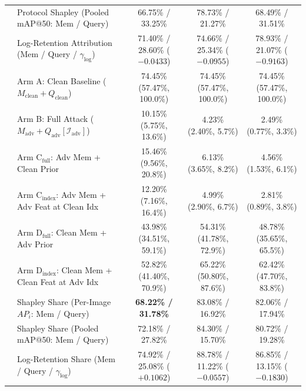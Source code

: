 \documentclass[preprint,10pt]{elsarticle}
\begin{document}
\begin{table}[!htbp]
{\begin{tabular}{llccc}
& Protocol Shapley (Pooled mAP@50: Mem / Query) & 66.75\% / 33.25\% & 78.73\% / 21.27\% & 68.49\% / 31.51\% \\
& Log-Retention Attribution (Mem / Query / $\gamma_{\mathrm{log}}$) & 71.40\% / 28.60\% ($-0.0433$) & 74.66\% / 25.34\% ($-0.0955$) & 78.93\% / 21.07\% ($-0.9163$) \\
\midrule
{} & Arm A: Clean Baseline ($M_{\mathrm{clean}} + Q_{\mathrm{clean}}$) & 74.45\% (57.47\%, 100.0\%) & 74.45\% (57.47\%, 100.0\%) & 74.45\% (57.47\%, 100.0\%) \\
& Arm B: Full Attack ($M_{\mathrm{adv}} + Q_{\mathrm{adv}}[\mathcal{I}_{\mathrm{adv}}]$) & 10.15\% (5.75\%, 13.6\%) & 4.23\% (2.40\%, 5.7\%) & 2.49\% (0.77\%, 3.3\%) \\
& Arm $\text{C}_{\text{full}}$: Adv Mem + Clean Prior & 15.46\% (9.56\%, 20.8\%) & 6.13\% (3.65\%, 8.2\%) & 4.56\% (1.53\%, 6.1\%) \\
& Arm $\text{C}_{\text{index}}$: Adv Mem + Adv Feat at Clean Idx & 12.20\% (7.16\%, 16.4\%) & 4.99\% (2.90\%, 6.7\%) & 2.81\% (0.89\%, 3.8\%) \\
& Arm $\text{D}_{\text{full}}$: Clean Mem + Adv Prior & 43.98\% (34.51\%, 59.1\%) & 54.31\% (41.78\%, 72.9\%) & 48.78\% (35.65\%, 65.5\%) \\
& Arm $\text{D}_{\text{index}}$: Clean Mem + Clean Feat at Adv Idx & 52.82\% (41.40\%, 70.9\%) & 65.22\% (50.80\%, 87.6\%) & 62.42\% (47.70\%, 83.8\%) \\
& Shapley Share (Per-Image $AP_i$: Mem / Query) & \textbf{68.22\% / 31.78\%} & 83.08\% / 16.92\% & 82.06\% / 17.94\% \\
& Shapley Share (Pooled mAP@50: Mem / Query) & 72.18\% / 27.82\% & 84.30\% / 15.70\% & 80.72\% / 19.28\% \\
& Log-Retention Share (Mem / Query / $\gamma_{\mathrm{log}}$) & 74.92\% / 25.08\% ($+0.1062$) & 88.78\% / 11.22\% ($-0.0557$) & 86.85\% / 13.15\% ($-0.1830$) \\
\bottomrule
\end{tabular}%
}
\end{table}
\end{document}
